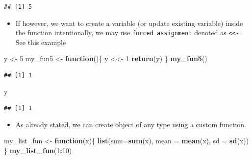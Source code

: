 \documentclass[
]{book}
\newenvironment{Shaded}{\begin{snugshade}}{\end{snugshade}}
\newcommand{\AttributeTok}[1]{\textcolor[rgb]{0.13,0.29,0.53}{#1}}
\newcommand{\ControlFlowTok}[1]{\textcolor[rgb]{0.13,0.29,0.53}{\textbf{#1}}}
\newcommand{\DecValTok}[1]{\textcolor[rgb]{0.00,0.00,0.81}{#1}}
\newcommand{\FunctionTok}[1]{\textcolor[rgb]{0.13,0.29,0.53}{\textbf{#1}}}
\newcommand{\NormalTok}[1]{#1}
\newcommand{\OtherTok}[1]{\textcolor[rgb]{0.56,0.35,0.01}{#1}}
\newcommand{\SpecialCharTok}[1]{\textcolor[rgb]{0.81,0.36,0.00}{\textbf{#1}}}
\providecommand{\tightlist}{%
  \setlength{\itemsep}{0pt}\setlength{\parskip}{0pt}}
\begin{document}
\begin{verbatim}
## [1] 5
\end{verbatim}

\begin{itemize}
\tightlist
\item
  If however, we want to create a variable (or update existing variable) inside the function intentionally, we may use \texttt{forced\ assignment} denoted as \texttt{\textless{}\textless{}-}. See this example
\end{itemize}

\begin{Shaded}
\begin{Highlighting}[]
\NormalTok{y }\OtherTok{\textless{}{-}} \DecValTok{5}
\NormalTok{my\_fun5 }\OtherTok{\textless{}{-}} \ControlFlowTok{function}\NormalTok{()\{}
\NormalTok{  y }\OtherTok{\textless{}\textless{}{-}} \DecValTok{1}
  \FunctionTok{return}\NormalTok{(y)}
\NormalTok{\}}
\FunctionTok{my\_fun5}\NormalTok{()}
\end{Highlighting}
\end{Shaded}

\begin{verbatim}
## [1] 1
\end{verbatim}

\begin{Shaded}
\begin{Highlighting}[]
\NormalTok{y}
\end{Highlighting}
\end{Shaded}

\begin{verbatim}
## [1] 1
\end{verbatim}

\begin{itemize}
\tightlist
\item
  As already stated, we can create object of any type using a custom function.
\end{itemize}

\begin{Shaded}
\begin{Highlighting}[]
\NormalTok{my\_list\_fun }\OtherTok{\textless{}{-}} \ControlFlowTok{function}\NormalTok{(x)\{}
  \FunctionTok{list}\NormalTok{(}\AttributeTok{sum=}\FunctionTok{sum}\NormalTok{(x),}
       \AttributeTok{mean =} \FunctionTok{mean}\NormalTok{(x),}
       \AttributeTok{sd =} \FunctionTok{sd}\NormalTok{(x))}
\NormalTok{\}}
\FunctionTok{my\_list\_fun}\NormalTok{(}\DecValTok{1}\SpecialCharTok{:}\DecValTok{10}\NormalTok{)}
\end{Highlighting}
\end{Shaded}
\end{document}
